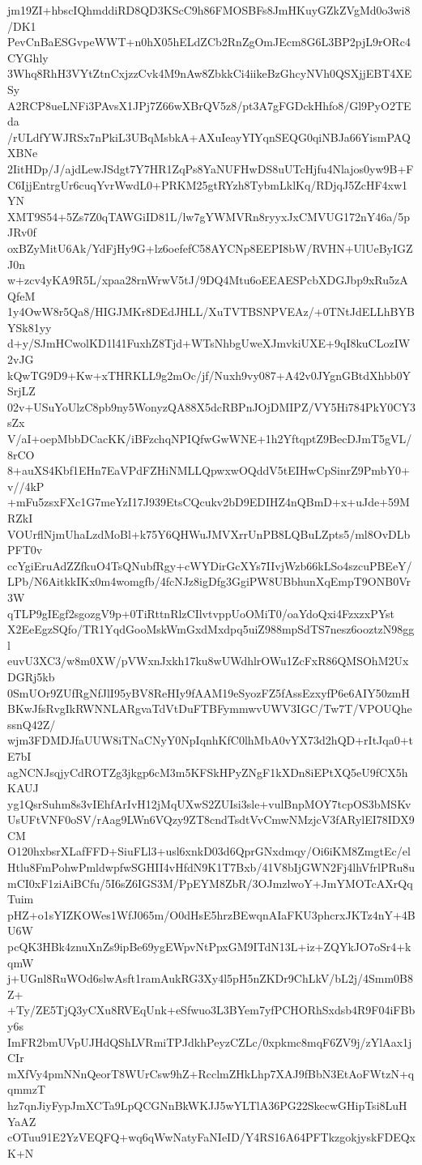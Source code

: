 jm19ZI+hbscIQhmddiRD8QD3KScC9h86FMOSBFs8JmHKuyGZkZVgMd0o3wi8/DK1
PevCnBaESGvpeWWT+n0hX05hELdZCb2RnZgOmJEcm8G6L3BP2pjL9rORc4CYGhly
3Whq8RhH3VYtZtnCxjzzCvk4M9nAw8ZbkkCi4iikeBzGhcyNVh0QSXjjEBT4XESy
A2RCP8ueLNFi3PAvsX1JPj7Z66wXBrQV5z8/pt3A7gFGDckHhfo8/Gl9PyO2TEda
/rULdfYWJRSx7nPkiL3UBqMsbkA+AXuIeayYIYqnSEQG0qiNBJa66YismPAQXBNe
2IitHDp/J/ajdLewJSdgt7Y7HR1ZqPs8YaNUFHwDS8uUTcHjfu4Nlajos0yw9B+F
C6IjjEntrgUr6cuqYvrWwdL0+PRKM25gtRYzh8TybmLklKq/RDjqJ5ZcHF4xw1YN
XMT9S54+5Zs7Z0qTAWGiID81L/lw7gYWMVRn8ryyxJxCMVUG172nY46a/5pJRv0f
oxBZyMitU6Ak/YdFjHy9G+lz6oefefC58AYCNp8EEPI8bW/RVHN+UlUeByIGZJ0n
w+zcv4yKA9R5L/xpaa28rnWrwV5tJ/9DQ4Mtu6oEEAESPcbXDGJbp9xRu5zAQfeM
1y4OwW8r5Qa8/HIGJMKr8DEdJHLL/XuTVTBSNPVEAz/+0TNtJdELLhBYBYSk81yy
d+y/SJmHCwolKD1l41FuxhZ8Tjd+WTsNhbgUweXJmvkiUXE+9qI8kuCLozIW2vJG
kQwTG9D9+Kw+xTHRKLL9g2mOc/jf/Nuxh9vy087+A42v0JYgnGBtdXhbb0YSrjLZ
02v+USuYoUlzC8pb9ny5WonyzQA88X5dcRBPnJOjDMIPZ/VY5Hi784PkY0CY3sZx
V/aI+oepMbbDCacKK/iBFzchqNPIQfwGwWNE+1h2YftqptZ9BecDJmT5gVL/8rCO
8+auXS4Kbf1EHn7EaVPdFZHiNMLLQpwxwOQddV5tEIHwCpSinrZ9PmbY0+v//4kP
+mFu5zsxFXc1G7meYzI17J939EtsCQcukv2bD9EDIHZ4nQBmD+x+uJde+59MRZkI
VOUrflNjmUhaLzdMoBl+k75Y6QHWuJMVXrrUnPB8LQBuLZpts5/ml8OvDLbPFT0v
ccYgiEruAdZZfkuO4TsQNubfRgy+cWYDirGcXYs7IIvjWzb66kLSo4szcuPBEeY/
LPb/N6AitkkIKx0m4womgfb/4fcNJz8igDfg3GgiPW8UBbhunXqEmpT9ONB0Vr3W
qTLP9gIEgf2sgozgV9p+0TiRttnRlzCIlvtvppUoOMiT0/oaYdoQxi4FzxzxPYst
X2EeEgzSQfo/TR1YqdGooMskWmGxdMxdpq5uiZ988mpSdTS7nesz6ooztzN98ggl
euvU3XC3/w8m0XW/pVWxnJxkh17ku8wUWdhlrOWu1ZcFxR86QMSOhM2UxDGRj5kb
0SmUOr9ZUfRgNfJlI95yBV8ReHIy9fAAM19eSyozFZ5fAssEzxyfP6e6AIY50zmH
BKwJfsRvgIkRWNNLARgvaTdVtDuFTBFymmwvUWV3IGC/Tw7T/VPOUQhessnQ42Z/
wjm3FDMDJfaUUW8iTNaCNyY0NpIqnhKfC0lhMbA0vYX73d2hQD+rItJqa0+tE7bI
agNCNJsqjyCdROTZg3jkgp6cM3m5KFSkHPyZNgF1kXDn8iEPtXQ5eU9fCX5hKAUJ
yg1QsrSuhm8s3vIEhfArIvH12jMqUXwS2ZUIsi3sle+vulBnpMOY7tcpOS3bMSKv
UsUFtVNF0oSV/rAag9LWn6VQzy9ZT8cndTsdtVvCmwNMzjcV3fARylEI78IDX9CM
O120hxbsrXLafFFD+SiuFLl3+usl6xnkD03d6QprGNxdmqy/Oi6iKM8ZmgtEc/el
Htlu8FmPohwPmldwpfwSGHII4vHfdN9K1T7Bxb/41V8bIjGWN2Fj4lhVfrlPRu8u
mCI0xF1ziAiBCfu/5I6sZ6IGS3M/PpEYM8ZbR/3OJmzlwoY+JmYMOTcAXrQqTuim
pHZ+o1sYIZKOWes1WfJ065m/O0dHsE5hrzBEwqnAIaFKU3phcrxJKTz4nY+4BU6W
pcQK3HBk4znuXnZs9ipBe69ygEWpvNtPpxGM9ITdN13L+iz+ZQYkJO7oSr4+kqmW
j+UGnl8RuWOd6slwAsft1ramAukRG3Xy4l5pH5nZKDr9ChLkV/bL2j/4Smm0B8Z+
+Ty/ZE5TjQ3yCXu8RVEqUnk+eSfwuo3L3BYem7yfPCHORhSxdsb4R9F04iFBby6s
ImFR2bmUVpUJHdQShLVRmiTPJdkhPeyzCZLc/0xpkmc8mqF6ZV9j/zYlAax1jCIr
mXfVy4pmNNnQeorT8WUrCsw9hZ+RcclmZHkLhp7XAJ9fBbN3EtAoFWtzN+qqmmzT
hz7qnJiyFypJmXCTa9LpQCGNnBkWKJJ5wYLTlA36PG22SkecwGHipTsi8LuHYaAZ
cOTuu91E2YzVEQFQ+wq6qWwNatyFaNIeID/Y4RS16A64PFTkzgokjyskFDEQxK+N
